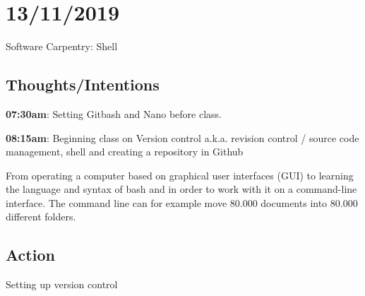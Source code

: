 \documentclass{article}
\begin{document}
\section{13/11/2019}

Software Carpentry: Shell


\subsection{Thoughts/Intentions}


\item \textbf{07:30am}: Setting Gitbash and Nano before class. 
\item \textbf{08:15am}: Beginning class on Version control a.k.a. revision control / source code management, shell and creating a repository in Github
\item From operating a computer based on graphical user interfaces (GUI) to learning the language and syntax of bash and in order to work with it on a command-line interface. The command line can for example move 80.000 documents into 80.000 different folders. 

\subsection{Action}

Setting up version control
\end{document}
